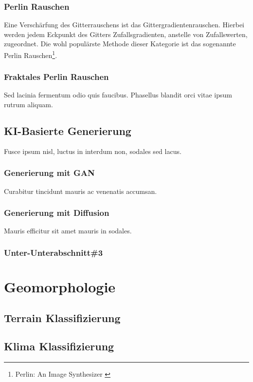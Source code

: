 \subsubsection{Perlin Rauschen}

Eine Verschärfung des Gitterrauschens ist das Gittergradientenrauschen. Hierbei werden jedem Eckpunkt des Gitters Zufallsgradienten, anstelle von Zufallswerten, zugeordnet. Die wohl populärste Methode dieser Kategorie ist das sogenannte Perlin Rauschen\footnote{
    Perlin: An Image Synthesizer
    \cite{perlin1985image}
}. 

\subsubsection{Fraktales Perlin Rauschen}

Sed lacinia fermentum odio quis faucibus. Phasellus blandit orci vitae ipsum rutrum aliquam. 

\subsection{KI-Basierte Generierung}

Fusce ipsum nisl, luctus in interdum non, sodales sed lacus. 

\subsubsection{Generierung mit GAN}

Curabitur tincidunt mauris ac venenatis accumsan. 

\subsubsection{Generierung mit Diffusion}

Mauris efficitur sit amet mauris in sodales. 

\subsubsection{Unter-Unterabschnitt\#3}


\section{Geomorphologie}


\subsection{Terrain Klassifizierung}

\subsection{Klima Klassifizierung}

